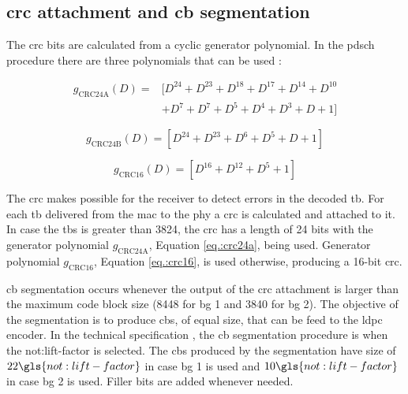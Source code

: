 \subsection{\gls{crc} attachment and \gls{cb} segmentation}

The \gls{crc} bits are calculated from a cyclic generator polynomial.
%
In the \gls{pdsch} procedure there are three polynomials that can be used \cite{3gpp.38.212}:

\begin{equation} \label{eq.:crc24a}
    \begin{split}
        g_{\mathrm{CRC24A}}(D) = & [ D^{24} + D^{23} + D^{18} + D^{17} +  D^{14} + D^{10} \\ & + D^{7} + D^{7} + D^{5} + D^{4} + D^{3} + D + 1 ]
    \end{split}
\end{equation}

\begin{equation}\label{eq.:crc24b}
    g_{\mathrm{CRC24B}}(D) = \left[ D^{24} + D^{23} + D^{6} + D^{5} + D + 1 \right]
\end{equation}

\begin{equation} \label{eq.:crc16}
    g_{\mathrm{CRC16}}(D) = \left[ D^{16} + D^{12} + D^{5} + 1 \right]
\end{equation}


The \gls{crc} makes possible for the receiver to detect errors in the decoded \gls{tb}.
%
For each \gls{tb} delivered from the \gls{mac} to the \gls{phy} a \gls{crc} is calculated and attached to it.
%
In case the \gls{tbs} is greater than 3824, the \gls{crc} has a length of 24 bits with the generator polynomial $g_{\mathrm{CRC24A}}$, Equation \eqref{eq.:crc24a}, being used.
%
Generator polynomial $g_{\mathrm{CRC16}}$, Equation \eqref{eq.:crc16}, is used otherwise, producing a 16-bit \gls{crc}.


\Gls{cb} segmentation occurs whenever the output of the \gls{crc} attachment is larger than the maximum code block size (8448 for \gls{bg} 1 and 3840 for \gls{bg} 2).
%
The objective of the segmentation is to produce \glspl{cb}, of equal size, that can be feed to the \gls{ldpc} encoder.
%
In the technical specification \cite{3gpp.38.212}, the \gls{cb} segmentation procedure is when the \gls{not:lift-factor} is selected.
%
The \glspl{cb} produced by the segmentation have size of $22 \gls{not:lift-factor}$ in case \gls{bg} 1 is used and $10 \gls{not:lift-factor}$ in case \gls{bg} 2 is used.
%
Filler bits are added whenever needed.

